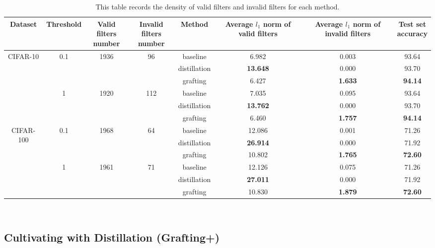 \documentclass{article}
\begin{document}
\begin{table}[!h]
	\caption{This table records the density of valid filters and invalid filters for each method.  } 
	\small
	\begin{center}
		\begin{tabular}{|c|c|c|c|c|c|c|c|} 
			\hline 
			Dataset&Threshold&\makecell[tc]{Valid filters\\number}&\makecell[tc]{Invalid filters\\number}&Method &\makecell[tc]{
				Average $l_{1}$ norm \\ of valid filters}& \makecell[tc]{Average $l_{1}$ norm of\\ invalid filters}&\makecell[tc]{Test set\\accuracy} \\ 
			\hline
			\multirow{6}{*}{CIFAR-10}&
			\multirow{3}{*}{0.1}&\multirow{3}{*}{1936}&\multirow{3}{*}{96}
			&baseline&6.982&0.003&93.64\\
			&&&&distillation&\textbf{13.648}&0.000&93.70\\
			&&&&grafting&6.427&\textbf{1.633}&\textbf{94.14}\\
			\cline{2-8}
			&\multirow{3}{*}{1}&\multirow{3}{*}{1920}&\multirow{3}{*}{112}
			&baseline&7.035&0.095&93.64\\
			&&&&distillation&\textbf{13.762}&0.000&93.70\\
			&&&&grafting&6.460&\textbf{1.757}&\textbf{94.14}\\
			\hline
			\multirow{6}{*}{CIFAR-100}&
			\multirow{3}{*}{0.1}&\multirow{3}{*}{1968}&\multirow{3}{*}{64}
			&baseline&12.086&0.001&71.26\\
			&&&&distillation&\textbf{26.914}&0.000&71.92\\
			&&&&grafting&10.802&\textbf{1.765}&\textbf{72.60}\\
			\cline{2-8}
			&\multirow{3}{*}{1}&\multirow{3}{*}{1961}&\multirow{3}{*}{71}
			&baseline&12.126&0.075&71.26\\
			&&&&distillation&\textbf{27.011}&0.000&71.92\\
			&&&&grafting&10.830&\textbf{1.879}&\textbf{72.60}\\
			\hline
		\end{tabular}\\
	\end{center}
	\label{table:branches}
\end{table}

\subsection{Cultivating with Distillation (Grafting+)}\label{sec_4_3}
\end{document}
